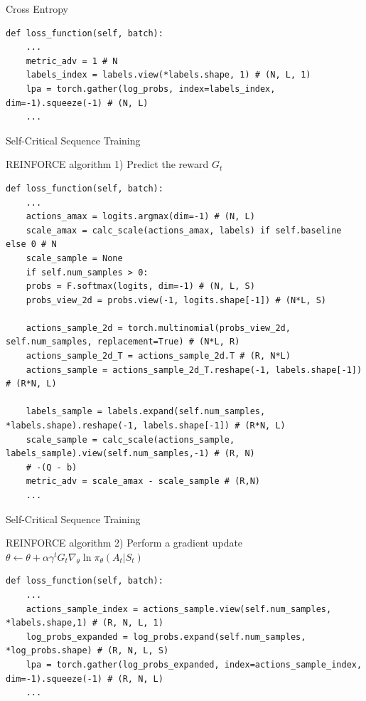 \documentclass[aspectratio=169,xcolor=dvipsnames]{beamer}
\begin{document}
\begin{frame}[fragile]{Cross Entropy}
\begin{verbatim}
def loss_function(self, batch):
    ...
    metric_adv = 1 # N
    labels_index = labels.view(*labels.shape, 1) # (N, L, 1)
    lpa = torch.gather(log_probs, index=labels_index, dim=-1).squeeze(-1) # (N, L)
    ...
\end{verbatim}
\end{frame}
\begin{frame}[fragile]{Self-Critical Sequence Training}
\begin{block}{REINFORCE algorithm}
1) Predict the reward $G_t$
\end{block}
\begin{verbatim}
def loss_function(self, batch):
    ...
    actions_amax = logits.argmax(dim=-1) # (N, L)
    scale_amax = calc_scale(actions_amax, labels) if self.baseline else 0 # N
    scale_sample = None
    if self.num_samples > 0:
    probs = F.softmax(logits, dim=-1) # (N, L, S)
    probs_view_2d = probs.view(-1, logits.shape[-1]) # (N*L, S)

    actions_sample_2d = torch.multinomial(probs_view_2d, self.num_samples, replacement=True) # (N*L, R)
    actions_sample_2d_T = actions_sample_2d.T # (R, N*L)
    actions_sample = actions_sample_2d_T.reshape(-1, labels.shape[-1]) # (R*N, L)

    labels_sample = labels.expand(self.num_samples, *labels.shape).reshape(-1, labels.shape[-1]) # (R*N, L)
    scale_sample = calc_scale(actions_sample, labels_sample).view(self.num_samples,-1) # (R, N)
    # -(Q - b)
    metric_adv = scale_amax - scale_sample # (R,N)
    ...
\end{verbatim}
\end{frame}
\begin{frame}[fragile]{Self-Critical Sequence Training}
    \begin{block}{REINFORCE algorithm}
        2) Perform a gradient update $\theta \leftarrow \theta + \alpha \gamma^t G_t \nabla_\theta \ln \pi_\theta(A_t \vert S_t)$\ \cite{weng_policy_2018}
    \end{block}
\begin{verbatim}
def loss_function(self, batch):
    ...
    actions_sample_index = actions_sample.view(self.num_samples, *labels.shape,1) # (R, N, L, 1)
    log_probs_expanded = log_probs.expand(self.num_samples, *log_probs.shape) # (R, N, L, S)
    lpa = torch.gather(log_probs_expanded, index=actions_sample_index, dim=-1).squeeze(-1) # (R, N, L)
    ...
\end{verbatim}
\end{frame}
\end{document}
